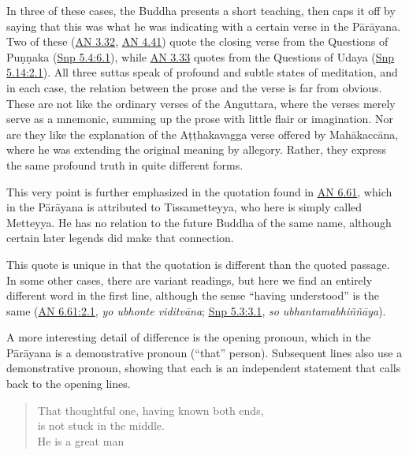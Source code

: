 \documentclass[12pt,openany]{book}%
\begin{document}
In three of these cases, the Buddha presents a short teaching, then caps it off by saying that this was what he was indicating with a certain verse in the \textsanskrit{Pārāyana}. Two of these (\href{https://suttacentral.net/an3.32/en/sujato}{AN 3.32}, \href{https://suttacentral.net/an4.41/en/sujato}{AN 4.41}) quote the closing verse from the Questions of \textsanskrit{Puṇṇaka} (\href{https://suttacentral.net/snp5.4/en/sujato\#6.1}{Snp 5.4:6.1}), while \href{https://suttacentral.net/an3.33/en/sujato}{AN 3.33} quotes from the Questions of Udaya (\href{https://suttacentral.net/snp5.14/en/sujato\#2.1}{Snp 5.14:2.1}). All three suttas speak of profound and subtle states of meditation, and in each case, the relation between the prose and the verse is far from obvious. These are not like the ordinary verses of the Anguttara, where the verses merely serve as a mnemonic, summing up the prose with little flair or imagination. Nor are they like the explanation of the \textsanskrit{Aṭṭhakavagga} verse offered by \textsanskrit{Mahākaccāna}, where he was extending the original meaning by allegory. Rather, they express the same profound truth in quite different forms.

This very point is further emphasized in the quotation found in \href{https://suttacentral.net/an6.61/en/sujato}{AN 6.61}, which in the \textsanskrit{Pārāyana} is attributed to Tissametteyya, who here is simply called Metteyya. He has no relation to the future Buddha of the same name, although certain later legends did make that connection.

This quote is unique in that the quotation is different than the quoted passage. In some other cases, there are variant readings, but here we find an entirely different word in the first line, although the sense “having understood” is the same (\href{https://suttacentral.net/an6.61/en/sujato\#2.1}{AN 6.61:2.1}, \textit{yo ubhonte \textsanskrit{viditvāna}}; \href{https://suttacentral.net/snp5.3/en/sujato\#3.1}{Snp 5.3:3.1}, \textit{so \textsanskrit{ubhantamabhiññāya}}).

A more interesting detail of difference is the opening pronoun, which in the \textsanskrit{Pārāyana} is a demonstrative pronoun (“that” person). Subsequent lines also use a demonstrative pronoun, showing that each is an independent statement that calls back to the opening lines.

\begin{verse}%
That thoughtful one, having known both ends, \\
is not stuck in the middle. \\
He is a great man

%
\end{verse}
\end{document}
